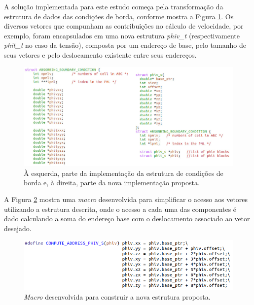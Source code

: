\documentclass[cic,tc]{iiufrgs}
\begin{document}
A solução implementada para este estudo começa pela transformação da estrutura de dados das condições de borda, conforme mostra
a Figura \ref{fig:abc}. Os diversos vetores que compunham as contribuições no cálculo de velocidade, por exemplo, foram encapsulados
em uma nova estrutura \textit{phiv\_t} (respectivamente \textit{phit\_t} no caso da tensão), composta por um endereço de base, pelo
tamanho de seus vetores e pelo deslocamento existente entre seus endereços.

\begin{figure}[!htb]
  \caption{À esquerda, parte da implementação da estrutura de condições de borda e, à direita, parte da
  nova implementação proposta.}
    \begin{center} 
      \includegraphics[width=35em]{abc}
    \end{center}
    \label{fig:abc}
\end{figure}

A Figura \ref{fig:compute_address} mostra uma \textit{macro} desenvolvida para simplificar o acesso aos vetores utilizando a estrutura
descrita, onde o acesso a cada uma das componentes é dado calculando a soma do endereço base com o deslocamento associado ao vetor desejado.

\begin{figure}[!htb]
  \caption{\textit{Macro} desenvolvida para construir a nova estrutura proposta.}
    \begin{center} 
      \includegraphics[width=35em]{compute_address}
    \end{center}
    \label{fig:compute_address}
\end{figure}
\end{document}
